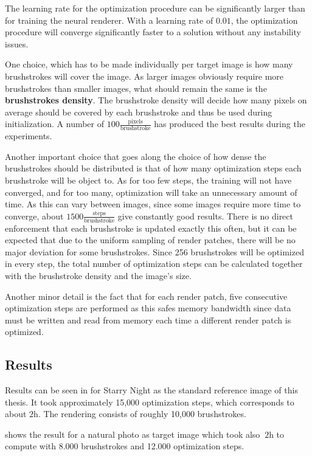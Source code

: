 The learning rate for the optimization procedure can be significantly larger than for training the neural renderer.
With a learning rate of $0.01$, the optimization procedure will converge significantly faster to a solution without any instability issues.

One choice, which has to be made individually per target image is how many brushstrokes will cover the image.
As larger images obviously require more brushstrokes than smaller images, what should remain the same is the \textbf{brushstrokes density}.
The brushstroke density will decide how many pixels on average should be covered by each brushstroke and thus be used during initialization.
A number of $100 \frac{\text{pixels}}{\text{brushstroke}}$ has produced the best results during the experiments.

Another important choice that goes along the choice of how dense the brushstrokes should be distributed is that of how many optimization steps each brushstroke will be object to.
As for too few steps, the training will not have converged, and for too many, optimization will take an unnecessary amount of time.
As this can vary between images, since some images require more time to converge, about $1500 \frac{\text{steps}}{\text{brushstroke}}$ give constantly good results.
There is no direct enforcement that each brushstroke is updated exactly this often, but it can be expected that due to the uniform sampling of render patches, there will be no major deviation for some brushstrokes.
Since 256 brushstrokes will be optimized in every step, the total number of optimization steps can be calculated together with the brushstroke density and the image's size.

Another minor detail is the fact that for each render patch, five consecutive optimization steps are performed as this safes memory bandwidth since data must be written and read from memory each time a different render patch is optimized.

\subsection{Results}

Results can be seen in  for Starry Night as the standard reference image of this thesis.
It took approximately 15,000 optimization steps, which corresponds to about $2\si{\hour}$.
The rendering consists of roughly 10,000 brushstrokes.

 shows the result for a natural photo as target image which took
also $~2\si{\hour}$ to compute with 8.000 brushstrokes and 12.000 optimization steps.


